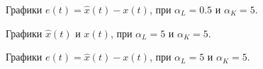 \begin{figure}[!h]
\caption{Графики $e(t) = \hat{x}(t)-x(t)$, при $\alpha_L = 0.5$ и $\alpha_K = 5$.}
\label{4_6_0.55e}
\end{figure}


\begin{figure}[!h]
\caption{Графики $\hat{x}(t)$ и $x(t)$, при $\alpha_L = 5$ и $\alpha_K = 5$.}
\label{4_6_55x}
\end{figure}

\begin{figure}[!h]
\caption{Графики $e(t) = \hat{x}(t)-x(t)$, при $\alpha_L = 5$ и $\alpha_K = 5$.}
\label{4_6_55e}
\end{figure}

